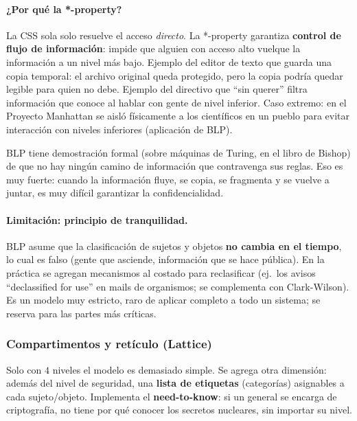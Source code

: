 \documentclass[../main.tex]{subfiles}
\begin{document}
\paragraph{¿Por qué la *-property?} La CSS sola solo resuelve el acceso \emph{directo}. La *-property garantiza \textbf{control de flujo de información}: impide que alguien con acceso alto vuelque la información a un nivel más bajo. Ejemplo del editor de texto que guarda una copia temporal: el archivo original queda protegido, pero la copia podría quedar legible para quien no debe. Ejemplo del directivo que ``sin querer'' filtra información que conoce al hablar con gente de nivel inferior. Caso extremo: en el Proyecto Manhattan se aisló físicamente a los científicos en un pueblo para evitar interacción con niveles inferiores (aplicación de BLP).

\begin{destacado}
BLP tiene demostración formal (sobre máquinas de Turing, en el libro de Bishop) de que no hay ningún camino de información que contravenga sus reglas. Eso es muy fuerte: cuando la información fluye, se copia, se fragmenta y se vuelve a juntar, es muy difícil garantizar la confidencialidad.
\end{destacado}

\paragraph{Limitación: principio de tranquilidad.} BLP asume que la clasificación de sujetos y objetos \textbf{no cambia en el tiempo}, lo cual es falso (gente que asciende, información que se hace pública). En la práctica se agregan mecanismos al costado para reclasificar (ej.\ los avisos ``declassified for use'' en mails de organismos; se complementa con Clark-Wilson). Es un modelo muy estricto, raro de aplicar completo a todo un sistema; se reserva para las partes más críticas.

\subsubsection{Compartimentos y retículo (Lattice)}

Solo con $4$ niveles el modelo es demasiado simple. Se agrega otra dimensión: además del nivel de seguridad, una \textbf{lista de etiquetas} (categorías) asignables a cada sujeto/objeto. Implementa el \textbf{need-to-know}: si un general se encarga de criptografía, no tiene por qué conocer los secretos nucleares, sin importar su nivel.
\end{document}
